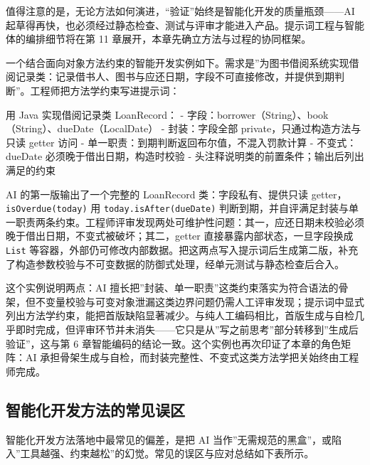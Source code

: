 \documentclass[12pt,a4paper,twoside,openany]{ctexbook}
\numberwithin{figure}{chapter}
\numberwithin{table}{chapter}
\newenvironment{Shaded}{}{}
\newcommand{\NormalTok}[1]{#1}
\begin{document}
值得注意的是，无论方法如何演进，``验证''始终是智能化开发的质量瓶颈------AI
起草得再快，也必须经过静态检查、测试与评审才能进入产品。提示词工程与智能体的编排细节将在第
11 章展开，本章先确立方法与过程的协同框架。

一个结合面向对象方法约束的智能开发实例如下。需求是''为图书借阅系统实现借阅记录类：记录借书人、图书与应还日期，字段不可直接修改，并提供到期判断''。工程师把方法学约束写进提示词：

\begin{Shaded}
\begin{Highlighting}[]
\NormalTok{用 Java 实现借阅记录类 LoanRecord：}
\NormalTok{{-} 字段：borrower（String）、book（String）、dueDate（LocalDate）}
\NormalTok{{-} 封装：字段全部 private，只通过构造方法与只读 getter 访问}
\NormalTok{{-} 单一职责：到期判断返回布尔值，不混入罚款计算}
\NormalTok{{-} 不变式：dueDate 必须晚于借出日期，构造时校验}
\NormalTok{{-} 头注释说明类的前置条件；输出后列出满足的约束}
\end{Highlighting}
\end{Shaded}

AI 的第一版输出了一个完整的 LoanRecord 类：字段私有、提供只读
getter，\texttt{isOverdue(today)} 用 \texttt{today.isAfter(dueDate)}
判断到期，并自评满足封装与单一职责两条约束。工程师评审发现两处可维护性问题：其一，应还日期未校验必须晚于借出日期，不变式被破坏；其二，getter
直接暴露内部状态，一旦字段换成 \texttt{List}
等容器，外部仍可修改内部数据。把这两点写入提示词后生成第二版，补充了构造参数校验与不可变数据的防御式处理，经单元测试与静态检查后合入。

这个实例说明两点：AI
擅长把''封装、单一职责''这类约束落实为符合语法的骨架，但不变量校验与可变对象泄漏这类边界问题仍需人工评审发现；提示词中显式列出方法学约束，能把首版缺陷显著减少。与纯人工编码相比，首版生成与自检几乎即时完成，但评审环节并未消失------它只是从''写之前思考''部分转移到''生成后验证''，这与第
6 章智能编码的结论一致。这个实例也再次印证了本章的角色矩阵：AI
承担骨架生成与自检，而封装完整性、不变式这类方法学把关始终由工程师完成。

\subsection{智能化开发方法的常见误区}\label{ux667aux80fdux5316ux5f00ux53d1ux65b9ux6cd5ux7684ux5e38ux89c1ux8befux533a}

智能化开发方法落地中最常见的偏差，是把 AI
当作''无需规范的黑盒''，或陷入''工具越强、约束越松''的幻觉。常见的误区与应对总结如下表所示。
\end{document}

